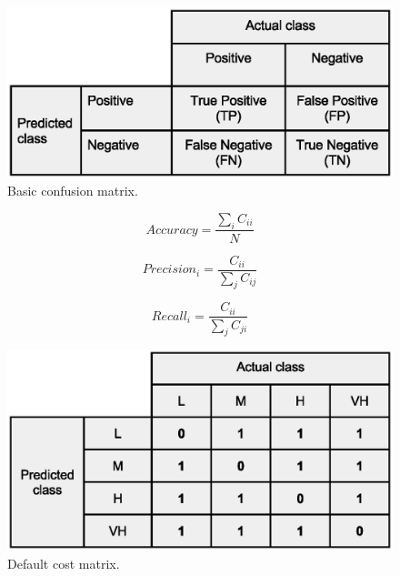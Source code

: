 \documentclass{llncs}
\begin{document}
\begin{figure}[ht]
\begin{center}
\includegraphics[scale=0.50]{confusion-matrix}
\end{center}
\caption{Basic confusion matrix.}
\label{fig:confusionmatrix}
\end{figure}

\begin{equation}
Accuracy=\frac{\sum_{i}C_{ii}}{N}
\label{equation:acc}
\end{equation}


\begin{equation}
Precision_{i}=\frac{C_{ii}}{\sum_{j}C_{ij}}
\label{equation:precision}
\end{equation}


\begin{equation}
Recall_{i}=\frac{C_{ii}}{\sum_{j}C_{ji}}
\label{equation:recall}
\end{equation}

\begin{figure}[ht]
\begin{center}
\includegraphics[scale=0.40]{Confusion-matrix-multiclass-default}
\end{center}
\caption{Default cost matrix.}
\label{fig:count}
\end{figure}
\end{document}
